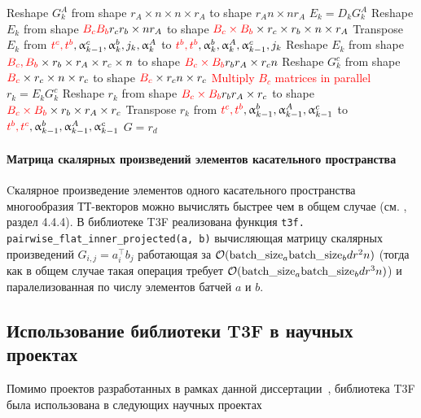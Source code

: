 \begin{algorithm}[tb]
\begin{algorithmic}[1]
   \STATE Reshape $G_k^A$ from shape $r_A \times n \times n \times r_A$ to shape $r_A n \times n r_A$
   \STATE $E_k = D_k G_k^A$ 
   \STATE Reshape $E_k$ from shape $\textcolor{red}{B_c B_b} r_c r_b \times n r_A$ to shape $\textcolor{red}{B_c \times B_b} \times r_c \times r_b \times n \times r_A$
   \STATE Transpose $E_k$ from $\textcolor{red}{t^c, t^b},\alpha_{k-1}^c, \alpha_{k}^b,j_k,\alpha_{k}^A$ to $\textcolor{red}{t^b, t^b},\alpha_{k}^b,\alpha_{k}^A,\alpha_{k-1}^c,j_k$
   \STATE Reshape $E_k$ from shape $\textcolor{red}{B_c, B_b} \times  r_b \times r_A \times r_c \times n$ to shape $\textcolor{red}{B_c \times B_b} r_b r_A \times r_c n$
   \STATE Reshape $G_k^c$ from shape $\textcolor{red}{B_c} \times r_c \times n \times r_c$ to shape $\textcolor{red}{B_c} \times r_c n \times r_c$
   \STATE \textcolor{red}{Multiply $B_c$ matrices in parallel} $r_k = E_k G_k^c$ 
   \STATE Reshape $r_k$ from shape $\textcolor{red}{B_c \times B_b} r_b r_A \times r_c$ to shape $\textcolor{red}{B_c \times B_b} \times r_b \times r_A \times r_c$
   \STATE Transpose $r_k$ from $\textcolor{red}{t^c, t^b}, \alpha_{k-1}^b,\alpha_{k-1}^A, \alpha_{k-1}^c$ to $\textcolor{red}{t^b, t^c}, \alpha_{k-1}^b,\alpha_{k-1}^A, \alpha_{k-1}^c$ 
   \ENDFOR
   \STATE $G = r_d$
\end{algorithmic}
\end{algorithm}

\paragraph{Матрица скалярных произведений элементов касательного пространства}
Cкалярное произведение элементов одного касательного пространства многообразия ТТ-векторов можно вычислять быстрее чем в общем случае (см. \cite{Steinlechner2016}, раздел 4.4.4). В библиотеке T3F реализована функция \texttt{t3f. pairwise\_flat\_inner\_projected(a, b)} вычисляющая матрицу скалярных произведений $G_{i,j} = a_i^\intercal b_j$ работающая за $\compl(\text{batch\_size}_a \text{batch\_size}_b d r^2 n)$  (тогда как в общем случае такая операция требует $\compl(\text{batch\_size}_a \text{batch\_size}_b d r^3 n)$) и паралелизованная по числу элементов батчей $a$ и $b$.


\subsection{Использование библиотеки T3F в научных проектах}
Помимо проектов разработанных в рамках данной диссертации~\cite{tensor-net?,mrf?,exp machines?,quantum}, библиотека T3F была использована в следующих научных проектах
